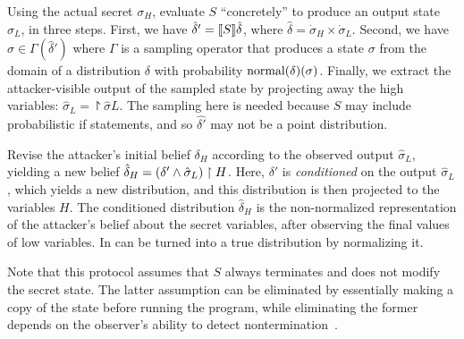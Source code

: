  Using the actual
secret $\sigma_H$, evaluate $S$ ``concretely'' to produce an output
state $\hat{\sigma}_L$, in three steps. 
First, we have $\hat{\delta}' = [\![{S}]\!]{\hat{\delta}}$, where
$\hat{\delta} = \dot{\sigma}_H \times \dot{\sigma}_L $.  
Second, we have $\hat{\sigma} \in \Gamma(\hat{\delta}')$ where $\Gamma$
is a sampling operator that produces a state $\sigma$ from the domain
of a distribution $\delta$ with probability $ \text{normal}(\delta)(\sigma)
$. Finally, we extract the attacker-visible output of the sampled
state by projecting away the high variables: $\hat{\sigma}_L =
\project{\hat{\sigma}}{L}$. The sampling here is needed because $S$
may include probabilistic if statements, and so $\hat{\delta'}$ may not
be a point distribution.

 Revise the attacker's initial belief $\delta_H$
according to the observed output $\hat{\sigma}_L$, yielding a new
belief $\hat{\delta}_H =
\left( \delta' \wedge \hat{\sigma}_L \right) \upharpoonright H$.  Here, $\delta'$ is
\emph{conditioned} on the output $\hat{\sigma}_L$, which yields a new
distribution, and this distribution is then projected to the variables
$H$.  %
%
The conditioned distribution $ \hat{\delta}_H $ is the non-normalized
representation of the attacker's belief about the secret variables,
after observing the final values of low variables. In can be
turned into a true distribution by normalizing it.

Note that this protocol assumes that $S$ always terminates and does not
modify the secret state.  The latter assumption can be eliminated by
essentially making a copy of the state before running the program, while
eliminating the former depends on the observer's ability to detect
nontermination~\cite{clarkson09quantifying}.


